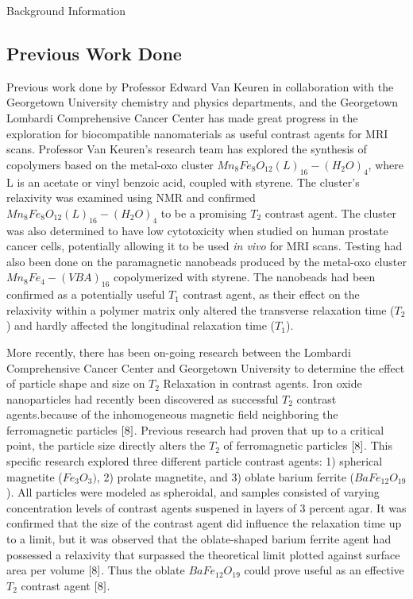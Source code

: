 \documentclass[a4paper,12pt]{article}
\begin{document}
\begin{section}{Background Information}
\subsection{Previous Work Done}
Previous work done by Professor Edward Van Keuren in collaboration with the Georgetown University chemistry and physics departments, and the Georgetown Lombardi Comprehensive Cancer Center has made great progress in the exploration for biocompatible nanomaterials as useful contrast agents for MRI scans. Professor Van Keuren's research team has explored the synthesis of copolymers based on the metal-oxo cluster $Mn_8 Fe_8 O_{12}(L)_{16}-(H_2 O)_4$, where L is an acetate or vinyl benzoic acid, coupled with styrene\cite[p.~9040]{7}. The cluster's relaxivity was examined using NMR and confirmed $Mn_8 Fe_8 O_{12}(L)_{16}-(H_2 O)_4$ to be a promising $T_2$ contrast agent. The cluster was also determined to have low cytotoxicity when studied on human prostate cancer cells, potentially allowing it to be used {\em in vivo} for MRI scans\cite[p.~9040]{7}. Testing had also been done on the paramagnetic nanobeads produced by the metal-oxo cluster $Mn_8 Fe_4 - (VBA)_{16}$ copolymerized with styrene. The nanobeads had been confirmed as a potentially useful $T_1$ contrast agent, as their effect on the relaxivity within a polymer matrix only altered the transverse relaxation time ($T_2$) and hardly affected the longitudinal relaxation time ($T_1$)\cite{7}.

More recently, there has been on-going research between the Lombardi Comprehensive Cancer Center and Georgetown University to determine the effect of particle shape and size on $T_2$ Relaxation in contrast agents. Iron oxide nanoparticles had recently been discovered as successful $T_2$ contrast agents.because of the inhomogeneous magnetic field neighboring the ferromagnetic particles $\cite{8}$. Previous research had proven that up to a critical point, the particle size directly alters the $T_2$ of ferromagnetic particles $\cite{8}$. This specific research explored three different particle contrast agents: 1) spherical magnetite ($Fe_3 O_3)$, 2) prolate magnetite, and 3) oblate barium ferrite ($BaFe_{12}O_{19}$). All particles were modeled as spheroidal, and samples consisted of varying concentration levels of contrast agents suspened in layers of 3 percent agar. It was confirmed that the size of the contrast agent did influence the relaxation time up to a limit, but it was observed that the oblate-shaped barium ferrite agent had possessed a relaxivity that surpassed the theoretical limit plotted against surface area per volume $\cite{8}$. Thus the oblate $BaFe_{12}O_{19}$ could prove useful as an effective $T_2$ contrast agent $\cite{8}$.


\end{section}
\end{document}
